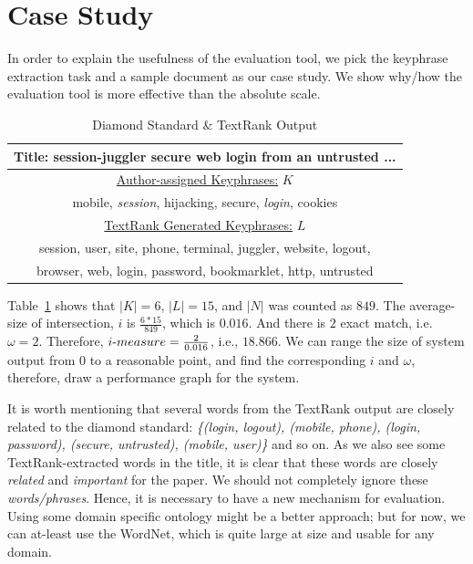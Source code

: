 \documentclass[a4paper]{report}
\begin{document}
\section{Case Study}
In order to explain the usefulness of the evaluation tool, we pick the keyphrase extraction task and a sample document as our case study. We show why/how the evaluation tool is more effective than the absolute scale. 
\begin{table}[h]
\centering
\begin{tabular}{c} 
\toprule
Title: session-juggler secure web login from an untrusted ...\\\midrule
\underline{Author-assigned Keyphrases:} $K$\\
mobile, {\it session}, hijacking, secure, {\it login}, cookies\\\midrule
\underline{TextRank Generated Keyphrases:} $L$\\
session, user, site, phone, terminal, juggler, website, logout,\\
browser, web, login, password, bookmarklet, http, untrusted\\
\bottomrule
\end{tabular}
\caption{Diamond Standard \& TextRank Output}
\label{keTable}
\end{table}
\vspace{-.2cm}
\par Table~\ref{keTable} shows that $|K| = 6$, $|L| = 15$, and $|N|$ was counted as $849$. The average-size of intersection, $i$ is $\frac{6 * 15}{849}$, which is $0.016$. And there is $2$ exact match, i.e. $\omega = 2$.
Therefore, $i\hbox{-}measure = \frac{2}{0.016}$, i.e., $18.866$. We can range the size of system output from $0$ to a reasonable point, and find the corresponding $i$ and $\omega$, therefore, draw a performance graph for the system. 
\par It is worth mentioning that several words from the TextRank  output are closely related to the diamond standard: \emph{\{(login, logout), (mobile, phone), (login, password), (secure, untrusted), (mobile, user)\}} and so on. As we also see some TextRank-extracted words in the title, it is clear that these words are closely \emph{related} and \emph{important} for the paper. We should not completely ignore these \emph{words/phrases}. Hence, it is necessary to have a new mechanism for evaluation. Using some domain specific ontology might be a better approach; but for now, we can at-least use the WordNet, which is quite large at size and usable for any domain.  
\end{document}
